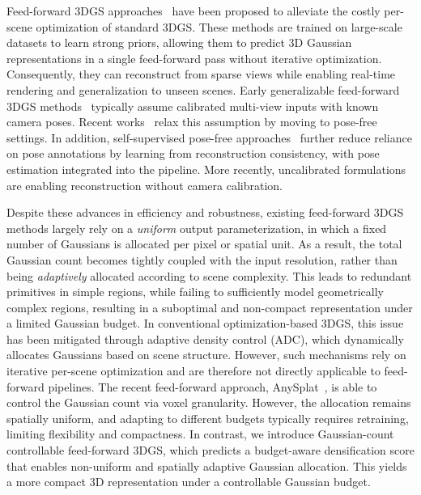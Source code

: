  Feed-forward 3DGS approaches~\cite{charatan2024pixelsplat, chen2024mvsplat, wang2024freesplat, chen2024pref3r, smart2024splatt3r, ye2024nopo, zhang2025flare, hong2024pf3plat, kang2025selfsplat, huang2025spfsplat, li2025vicasplat, jiang2025anysplat} have been proposed to alleviate the costly per-scene optimization of standard 3DGS. These methods are trained on large-scale datasets to learn strong priors, allowing them to predict 3D Gaussian representations in a single feed-forward pass without iterative optimization.
Consequently, they can reconstruct from sparse views while enabling real-time rendering and generalization to unseen scenes. Early generalizable feed-forward 3DGS methods~\cite{charatan2024pixelsplat, chen2024mvsplat, wang2024freesplat} typically assume calibrated multi-view inputs with known camera poses. Recent works~\cite{chen2024pref3r, smart2024splatt3r, ye2024nopo, zhang2025flare} relax this assumption by moving to pose-free settings. In addition, self-supervised pose-free approaches~\cite{hong2024pf3plat, kang2025selfsplat, huang2025spfsplat} further reduce reliance on pose annotations by learning from reconstruction consistency, with pose estimation integrated into the pipeline. More recently, uncalibrated formulations~\cite{li2025vicasplat, jiang2025anysplat} are enabling reconstruction without camera calibration.

Despite these advances in efficiency and robustness, existing feed-forward 3DGS methods largely rely on a \emph{uniform} output parameterization, in which a fixed number of Gaussians is allocated per pixel or spatial unit. As a result, the total Gaussian count becomes tightly coupled with the input resolution, rather than being \emph{adaptively} allocated according to scene complexity. This leads to redundant primitives in simple regions, while failing to sufficiently model geometrically complex regions, resulting in a suboptimal and non-compact representation under a limited Gaussian budget. In conventional optimization-based 3DGS, this issue has been mitigated through adaptive density control (ADC), which dynamically allocates Gaussians based on scene structure. However, such mechanisms rely on iterative per-scene optimization and are therefore not directly applicable to feed-forward pipelines. The recent feed-forward approach, AnySplat~\cite{jiang2025anysplat}, is able to control the Gaussian count via voxel granularity. However, the allocation remains spatially uniform, and adapting to different budgets typically requires retraining, limiting flexibility and compactness. In contrast, we introduce Gaussian-count controllable feed-forward 3DGS, which predicts a budget-aware densification score that enables non-uniform and spatially adaptive Gaussian allocation. This yields a more compact 3D representation under a controllable Gaussian budget.